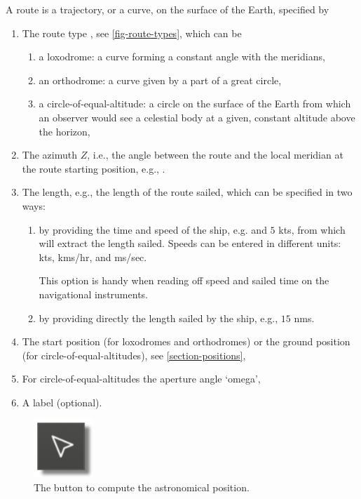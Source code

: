\documentclass{ol-softwaremanual}
\begin{document}
A \gls{route} is a trajectory, or a curve, on the surface of the Earth, specified by 
\begin{enumerate}
  \item \label{item-route-type} The \gls{route} type , see \cref{fig-route-types}, which can be \cite{bowditch2002the}
  \begin{enumerate}
  \item a \gls{loxodrome}: a curve forming a constant angle with the meridians,
  \item an \gls{orthodrome}: a curve given by a part of a great circle,
  \item  a \gls{circle-of-equal-altitude}: a circle on the surface of the Earth from which an observer would see a celestial \gls{body} at a given, constant altitude above the horizon,
  \end{enumerate}
  \item \label{item-route-azimuth} The \gls{azimuth} $Z$, i.e., the angle between the \gls{route}  and the local meridian at the \gls{route} starting \gls{position}, e.g., .
  \item \label{item-route-length} The length, e.g., the length of the \gls{route} sailed, which can be specified in two ways:
  \begin{enumerate}
  \item by providing the time and speed of the ship, e.g.   and $5$ \acp{kt}, from which  \thel will extract the length sailed. Speeds can be entered in different units: \acp{kt}, \acp{km}/\ac{hr},  and \acp{m}/\ac{sec}. 
  
  This option is handy when reading off speed and sailed time  on the navigational instruments. 
  \item by providing directly the length sailed by the ship, e.g.,  $15$ \acp{nm}. 
  \end{enumerate}

  \item \label{item-route-reference-position} The start \gls{position} (for \glspl{loxodrome} and \glspl{orthodrome}) or the ground position (for \glspl{circle-of-equal-altitude}), see \cref{section-positions},
  \item \label{item-route-aperture} For \glspl{circle-of-equal-altitude} the aperture angle `omega',
  \item \label{item-route-label} A label (optional). 
\end{enumerate}

\begin{figure}
  \centering
  \includegraphics[width=0.2\textwidth]{figures/position-button.png}
  \caption{\label{fig-position-button} The button to compute the astronomical position.}
  \end{figure}
\end{document}
